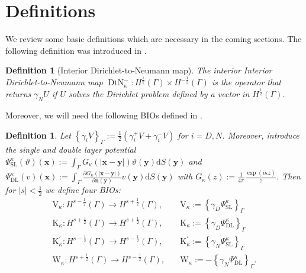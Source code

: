 \documentclass[12pt,journal,compsoc, onecolumn]{IEEEtran}
\newtheorem{definition}[theorem]{Definition}
\begin{document}
\section{Definitions}
\label{section:definitions}
We review some basic definitions which are necessary in the coming sections.
The following definition was introduced in \cite{meury2007stable}.
\begin{definition}[Interior Dirichlet-to-Neumann map]
    The interior Interior Dirichlet-to-Neumann map  \(\operatorname{DtN}_{\kappa}^{-}: H^{\frac{1}{2}}(\Gamma) \times H^{-\frac{1}{2}}(\Gamma)\) is the operator that returns $\gamma_NU$ if $U$ solves the Dirichlet problem defined by a vector in $ H^{\frac{1}{2}}(\Gamma)$. 
\end{definition}
\noindent
Moreover, we will need the following BIOs defined in \cite{costabel1988boundary} \cite{meury2007stable}.
\begin{definition}
Let \(\left\{\gamma_{i} V\right\}_{\Gamma}:=\frac{1}{2}\left(\gamma_{i}^{+} V+\gamma_{i}^{-} V\right)\) for $i = D, N$. Moreover, introduce the single and double layer potential \(\Psi_{\mathrm{SL}}^{\kappa}(\vartheta)(\mathbf{x}):=\int_{\Gamma} G_{\kappa}(|\mathbf{x}-\mathbf{y}|) \vartheta(\mathbf{y}) \mathrm{d} S(\mathbf{y})\) and \(\Psi_{\mathrm{DL}}^{\kappa}(v)(\mathbf{x}):=\int_{\Gamma} \frac{\partial G_{\kappa}(|\mathbf{x}-\mathbf{y}|)}{\partial \mathbf{n}(\mathbf{y})} v(\mathbf{y}) \mathrm{d} S(\mathbf{y})\) with \(G_{\kappa}(z):=\frac{1}{4 \pi} \frac{\exp (i \kappa z)}{z}\). 
Then for $|s| < \frac{1}{2}$ we define four BIOs:
\begin{align} 
\mathrm{V}_{\kappa}: H^{s-\frac{1}{2}}(\Gamma) \rightarrow H^{s+\frac{1}{2}}(\Gamma), & \quad \mathrm{V}_{\kappa}:=\left\{\gamma_{D} \Psi_{\mathrm{SL}}^{\kappa}\right\}_{\Gamma} \nonumber\\ \mathrm{K}_{\kappa}: H^{s+\frac{1}{2}}(\Gamma) \rightarrow H^{s+\frac{1}{2}}(\Gamma), & \quad \mathrm{K}_{\kappa}:=\left\{\gamma_{D} \Psi_{\mathrm{DL}}^{\kappa}\right\}_{\Gamma} \nonumber \\ \mathrm{K}_{\kappa}^{\prime}: H^{s-\frac{1}{2}}(\Gamma) \rightarrow H^{s-\frac{1}{2}}(\Gamma), & \quad \mathrm{K}_{\kappa}^{\prime}:=\left\{\gamma_{N} \Psi_{\mathrm{SL}}^{\kappa}\right\}_{\Gamma} \nonumber\\ \mathrm{W}_{\kappa}: H^{s+\frac{1}{2}}(\Gamma) \rightarrow H^{s-\frac{1}{2}}(\Gamma), & \quad \mathrm{W}_{\kappa}:=-\left\{\gamma_{N} \Psi_{\mathrm{DL}}^{\kappa}\right\}_{\Gamma}. \nonumber
\end{align}
\end{definition} 
\noindent
\end{document}
